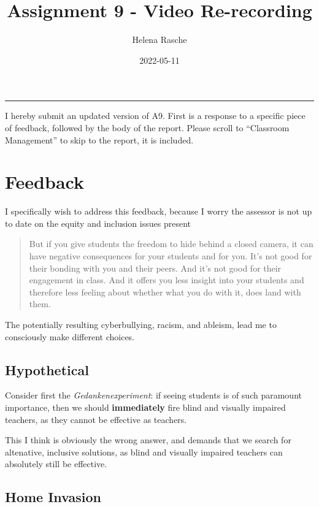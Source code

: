 \documentclass[paper=a4,justified,a4paper]{tufte-handout}
\title[A9 - Video Re-recording]{Assignment 9 - Video Re-recording}
\author{Helena Rasche}
\date{2022-05-11}
\begin{document}
\maketitle
\noindent\rule{5in}{0.4pt}


I hereby submit an updated version of A9. First is a response to a
specific piece of feedback, followed by the body of the report. Please
scroll to ``Classroom Management'' to skip to the report, it is
included.

\hypertarget{feedback}{%
\section{Feedback}\label{feedback}}

I specifically wish to address this feedback, because I worry the
assessor is not up to date on the equity and inclusion issues present

\begin{quote}
But if you give students the freedom to hide behind a closed camera, it
can have negative consequences for your students and for you. It's not
good for their bonding with you and their peers. And it's not good for
their engagement in class. And it offers you less insight into your
students and therefore less feeling about whether what you do with it,
does land with them.
\end{quote}

The potentially resulting cyberbullying, racism, and ableism, lead me to
consciously make different choices.

\hypertarget{hypothetical}{%
\subsection{Hypothetical}\label{hypothetical}}

Consider first the \emph{Gedankenexperiment}: if seeing students is of
such paramount importance, then we should \textbf{immediately} fire
blind and visually impaired teachers, as they cannot be effective as
teachers.

This I think is obviously the wrong answer, and demands that we search
for altenative, inclusive solutions, as blind and visually impaired
teachers can absolutely still be effective\citep{afzal2021sighted}.

\hypertarget{home-invasion}{%
\subsection{Home Invasion}\label{home-invasion}}
\end{document}
